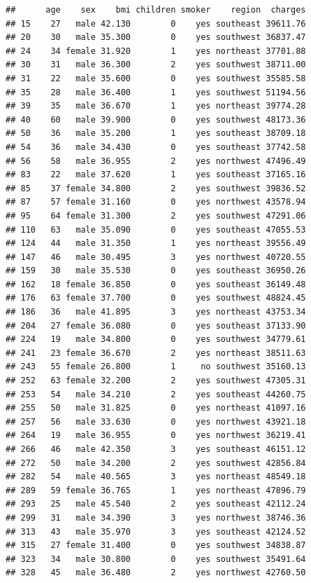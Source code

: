 \documentclass[
]{article}
\begin{document}
\begin{verbatim}
##      age    sex    bmi children smoker    region  charges
## 15    27   male 42.130        0    yes southeast 39611.76
## 20    30   male 35.300        0    yes southwest 36837.47
## 24    34 female 31.920        1    yes northeast 37701.88
## 30    31   male 36.300        2    yes southwest 38711.00
## 31    22   male 35.600        0    yes southwest 35585.58
## 35    28   male 36.400        1    yes southwest 51194.56
## 39    35   male 36.670        1    yes northeast 39774.28
## 40    60   male 39.900        0    yes southwest 48173.36
## 50    36   male 35.200        1    yes southeast 38709.18
## 54    36   male 34.430        0    yes southeast 37742.58
## 56    58   male 36.955        2    yes northwest 47496.49
## 83    22   male 37.620        1    yes southeast 37165.16
## 85    37 female 34.800        2    yes southwest 39836.52
## 87    57 female 31.160        0    yes northwest 43578.94
## 95    64 female 31.300        2    yes southwest 47291.06
## 110   63   male 35.090        0    yes southeast 47055.53
## 124   44   male 31.350        1    yes northeast 39556.49
## 147   46   male 30.495        3    yes northwest 40720.55
## 159   30   male 35.530        0    yes southeast 36950.26
## 162   18 female 36.850        0    yes southeast 36149.48
## 176   63 female 37.700        0    yes southwest 48824.45
## 186   36   male 41.895        3    yes northeast 43753.34
## 204   27 female 36.080        0    yes southeast 37133.90
## 224   19   male 34.800        0    yes southwest 34779.61
## 241   23 female 36.670        2    yes northeast 38511.63
## 243   55 female 26.800        1     no southwest 35160.13
## 252   63 female 32.200        2    yes southwest 47305.31
## 253   54   male 34.210        2    yes southeast 44260.75
## 255   50   male 31.825        0    yes northeast 41097.16
## 257   56   male 33.630        0    yes northwest 43921.18
## 264   19   male 36.955        0    yes northwest 36219.41
## 266   46   male 42.350        3    yes southeast 46151.12
## 272   50   male 34.200        2    yes southwest 42856.84
## 282   54   male 40.565        3    yes northeast 48549.18
## 289   59 female 36.765        1    yes northeast 47896.79
## 293   25   male 45.540        2    yes southeast 42112.24
## 299   31   male 34.390        3    yes northwest 38746.36
## 313   43   male 35.970        3    yes southeast 42124.52
## 315   27 female 31.400        0    yes southwest 34838.87
## 323   34   male 30.800        0    yes southwest 35491.64
## 328   45   male 36.480        2    yes northwest 42760.50

\end{verbatim}
\end{document}
